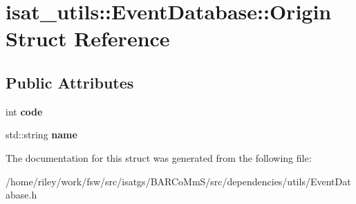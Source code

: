 \hypertarget{structisat__utils_1_1_event_database_1_1_origin}{}\section{isat\+\_\+utils\+:\+:Event\+Database\+:\+:Origin Struct Reference}
\label{structisat__utils_1_1_event_database_1_1_origin}
\subsection*{Public Attributes}
\begin{DoxyCompactItemize}
\item 
int {\bfseries code}\hypertarget{structisat__utils_1_1_event_database_1_1_origin_af71fc5f8872ff29e914b6964ed743971}{}\label{structisat__utils_1_1_event_database_1_1_origin_af71fc5f8872ff29e914b6964ed743971}

\item 
std\+::string {\bfseries name}\hypertarget{structisat__utils_1_1_event_database_1_1_origin_adf4bfbcf38089389c5664ef9bf8c95f8}{}\label{structisat__utils_1_1_event_database_1_1_origin_adf4bfbcf38089389c5664ef9bf8c95f8}

\end{DoxyCompactItemize}


The documentation for this struct was generated from the following file\+:\begin{DoxyCompactItemize}
\item 
/home/riley/work/fsw/src/isatgs/\+B\+A\+R\+Co\+Mm\+S/src/dependencies/utils/Event\+Database.\+h\end{DoxyCompactItemize}
